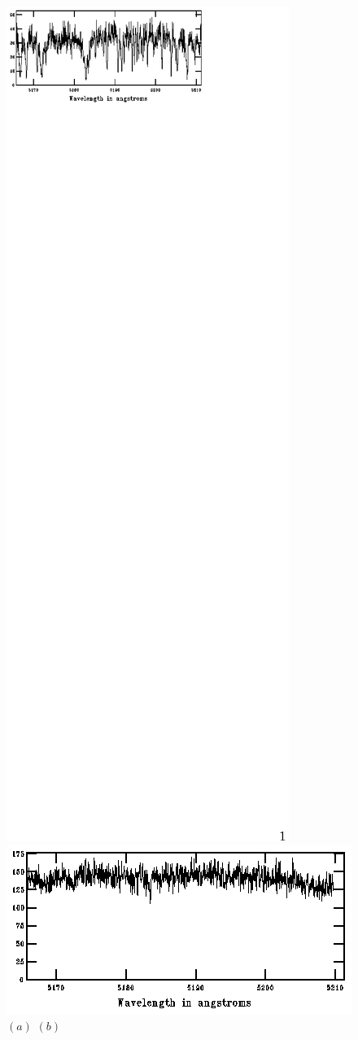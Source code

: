 \begin{figure}
\begin{center}
\centering
\includegraphics[width=.45\textwidth]{2_f4a}
\hspace{1cm}
\includegraphics[width=.45\textwidth]{2_f4b}\\
\textsc{\small $(a)$    \hspace{7cm}    $(b)$}\\

\end{center}
\end{figure}
